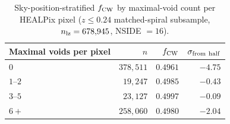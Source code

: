 \documentclass[twocolumn,linenumbers]{aastex702}
\begin{document}
\begin{table}[ht]
\caption{Sky-position-stratified $f_{\rm CW}$ by maximal-void count per
HEALPix pixel ($z \leq 0.24$ matched-spiral subsample, $n_{\rm lz} =
678{,}945$, NSIDE $= 16$).}
\label{tab:maximal_void_healpix}
\begin{ruledtabular}
\begin{tabular}{lrrr}
Maximal voids per pixel & $n$ & $f_{\rm CW}$ & $\sigma_{\rm from\ half}$ \\
\hline
$0$  & $378{,}511$ & $0.4961$ & $-4.75$ \\
$1$--$2$ & $19{,}247$ & $0.4985$ & $-0.43$ \\
$3$--$5$ & $23{,}127$ & $0.4997$ & $-0.09$ \\
$6+$ & $258{,}060$ & $0.4980$ & $-2.04$ \\
\end{tabular}
\end{ruledtabular}
\end{table}
\end{document}
